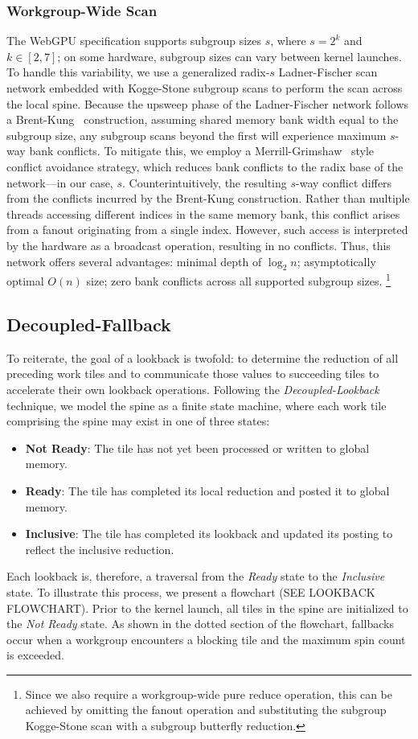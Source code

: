 \documentclass[sigconf]{acmart}
\begin{document}
\subsubsection{Workgroup-Wide Scan}
The WebGPU specification supports subgroup sizes $s$, where $s = 2^k$ and $k \in [2, 7]$; on some hardware, subgroup sizes can vary between kernel launches. To handle this variability, we use a generalized radix-$s$ Ladner-Fischer scan network embedded with Kogge-Stone subgroup scans to perform the scan across the local spine. Because the upsweep phase of the Ladner-Fischer network follows a Brent-Kung~\cite{1675982} construction, assuming shared memory bank width equal to the subgroup size, any subgroup scans beyond the first will experience maximum $s$-way bank conflicts. To mitigate this, we employ a Merrill-Grimshaw~\cite[Section 3.3.5]{Merrill2009} style conflict avoidance strategy, which reduces bank conflicts to the radix base of the network—in our case, $s$. Counterintuitively, the resulting $s$-way conflict differs from the conflicts incurred by the Brent-Kung construction. Rather than multiple threads accessing different indices in the same memory bank, this conflict arises from a fanout originating from a single index. However, such access is interpreted by the hardware as a broadcast operation, resulting in no conflicts. Thus, this network offers several advantages: minimal depth of $\log_2 n$; asymptotically optimal $O(n)$ size; zero bank conflicts across all supported subgroup sizes. \footnote{Since we also require a workgroup-wide pure reduce operation, this can be achieved by omitting the fanout operation and substituting the subgroup Kogge-Stone scan with a subgroup butterfly reduction.}

\subsection{Decoupled-Fallback}
To reiterate, the goal of a lookback is twofold: to determine the reduction of all preceding work tiles and to communicate those values to succeeding tiles to accelerate their own lookback operations. Following the \emph{Decoupled-Lookback} technique, we model the spine as a finite state machine, where each work tile comprising the spine may exist in one of three states:
\begin{itemize}
    \item \textbf{Not Ready}: The tile has not yet been processed or written to global memory.
    \item \textbf{Ready}: The tile has completed its local reduction and posted it to global memory.
    \item \textbf{Inclusive}: The tile has completed its lookback and updated its posting to reflect the inclusive reduction.
\end{itemize}
Each lookback is, therefore, a traversal from the \emph{Ready} state to the \emph{Inclusive} state. To illustrate this process, we present a flowchart (SEE LOOKBACK FLOWCHART). Prior to the kernel launch, all tiles in the spine are initialized to the \emph{Not Ready} state. As shown in the dotted section of the flowchart, fallbacks occur when a workgroup encounters a blocking tile and the maximum spin count is exceeded.
\end{document}
